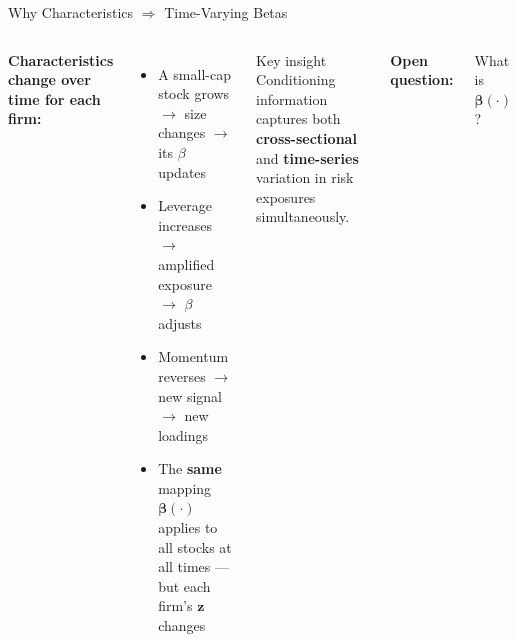 \documentclass[aspectratio=169]{beamer}
\newcommand{\bz}{\bm{z}}
\newcommand{\bbeta}{\bm{\beta}}
\newcommand{\bff}{\bm{f}}
\begin{document}
\begin{frame}{Why Characteristics $\Rightarrow$ Time-Varying Betas}

\begin{columns}[T]

\textbf{Characteristics change over time for each firm:}
\begin{itemize}
  \item A small-cap stock grows $\to$ size changes $\to$ its $\beta$ updates
  \item Leverage increases $\to$ amplified exposure $\to$ $\beta$ adjusts
  \item Momentum reverses $\to$ new signal $\to$ new loadings
  \item The \textbf{same} mapping $\bbeta(\cdot)$ applies to all stocks at all times --- but each firm's $\bz$ changes
\end{itemize}

\begin{exampleblock}{Key insight}
Conditioning information captures both \textbf{cross-sectional} and \textbf{time-series} variation in risk exposures simultaneously.
\end{exampleblock}

\centering
{}

\bigskip
\centerline{\small\color{navy}\textbf{Open question:}}
\centerline{\small\color{navy}What is $\bbeta(\cdot)$?}
\end{columns}

\end{frame}
%
%
\end{document}
